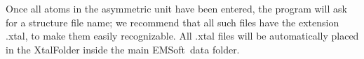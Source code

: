 \documentclass[DIV=calc, paper=letter, fontsize=11pt]{scrartcl}	 %
\newcommand{\ctp}{\textsf{EMSoft}}
\begin{document}
Once all atoms in the asymmetric unit have been entered, the program will ask for a structure file name; we
recommend that all such files have the extension \textsf{.xtal}, to make them easily recognizable.  All .xtal files
will be automatically placed in the \textsf{XtalFolder} inside the main \ctp\ data folder.
%
%
\end{document}
